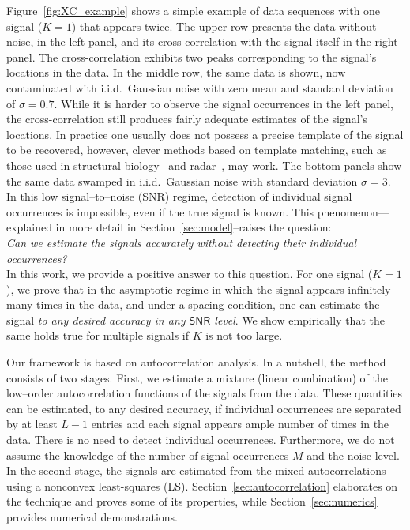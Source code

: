\documentclass[english,11pt]{article}
\newcommand{\TODO}[1]{{\color{red}{[#1]}}}
\numberwithin{equation}{section}
\theoremstyle{plain}
\theoremstyle{definition}
\theoremstyle{remark}
\theoremstyle{plain}
\theoremstyle{remark}
\theoremstyle{plain}
\theoremstyle{plain}
\newcommand{\SNR}{{\textsf{SNR}}}
\begin{document}
Figure~\ref{fig:XC_example} shows a simple example of data sequences with  one signal ($K=1$) that appears twice.
The upper row presents the data without noise, in the left panel, and its cross-correlation with the signal itself in the right panel. The cross-correlation exhibits two peaks corresponding to the signal's locations in the data. 
In  the middle row, the same data is shown, now contaminated with i.i.d.\ Gaussian noise with zero mean and standard deviation of $\sigma=0.7$. 
While it is harder to observe the signal occurrences in the left panel, the cross-correlation still produces fairly adequate estimates of the signal's locations. In practice one usually does not possess a precise template of the signal to be recovered, however, clever methods based on template matching, such as those used in structural biology~\cite{heimowitz2018apple} and radar~\cite{gogineni2017passive}, may work.
The bottom panels show the same data swamped in  
i.i.d.\ Gaussian noise with standard deviation  $\sigma=3$. In this  low signal--to--noise (\SNR) regime, 
detection of individual signal occurrences is impossible, 
even if the true signal is known. 
This phenomenon---explained in more detail in Section~\ref{sec:model}--raises the question: 
\medskip 
\\
\emph{Can we estimate the signals accurately without detecting their individual occurrences? }
 \\

In this work, we provide a positive answer to this question. For one signal ($K=1$), we prove that in the asymptotic regime in which the signal appears
infinitely many times in the data, and under a spacing condition, one can estimate the signal \emph{to any desired accuracy in any $\SNR$ level}. We show empirically that the same holds true for multiple signals if $K$ is not too large. \TODO{Do we want a sentence like: Based on  recent results on the multireference alignment problem, we conjecture that it remains true as long as $K \lesssim L/6$. ?}

Our framework is based on autocorrelation analysis.
In a nutshell, the method consists of two stages. First, we estimate a mixture (linear combination) of the low--order autocorrelation functions of the signals from the data. These quantities can be estimated, to any desired accuracy, if individual occurrences are separated by at least $L-1$ entries and  each signal appears ample number of times \TODO{?} in the data. There is no need to detect individual occurrences. 
Furthermore, we do not assume the knowledge of the number of signal occurrences $M$ and the noise level.
In the second stage, the signals are estimated from the mixed autocorrelations using a nonconvex least-squares (LS).
Section~\ref{sec:autocorrelation} elaborates on the technique and proves some of its properties, while Section~\ref{sec:numerics} provides numerical demonstrations.
\end{document}
